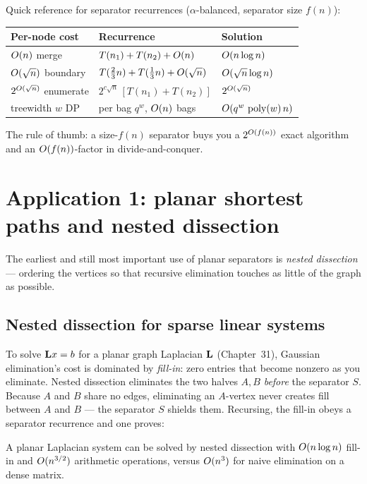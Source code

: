 \begin{complexitybox}
Quick reference for separator recurrences ($\alpha$-balanced, separator size $f(n)$):
\begin{center}
\begin{tabular}{lll}
\toprule
Per-node cost & Recurrence & Solution \\
\midrule
$O(n)$ merge & $T(n_1)+T(n_2)+O(n)$ & $O(n\log n)$ \\
$O(\sqrt n)$ boundary & $T(\tfrac23 n)+T(\tfrac13 n)+O(\sqrt n)$ & $O(\sqrt n\log n)$ \\
$2^{O(\sqrt n)}$ enumerate & $2^{c\sqrt n}\,[T(n_1)+T(n_2)]$ & $2^{O(\sqrt n)}$ \\
treewidth $w$ DP & per bag $q^{w}$, $O(n)$ bags & $O(q^{w}\,\operatorname{poly}(w)\,n)$ \\
\bottomrule
\end{tabular}
\end{center}
The rule of thumb: a size-$f(n)$ separator buys you a $2^{O(f(n))}$ exact algorithm and an $O(f(n))$-factor in divide-and-conquer.
\end{complexitybox}

\section{Application 1: planar shortest paths and nested dissection}

The earliest and still most important use of planar separators is \emph{nested dissection} --- ordering the vertices so that recursive elimination touches as little of the graph as possible.

\subsection{Nested dissection for sparse linear systems}

To solve $\mathbf{L} x=b$ for a planar graph Laplacian $\mathbf{L}$ (Chapter~31), Gaussian elimination's cost is dominated by \emph{fill-in}: zero entries that become nonzero as you eliminate. Nested dissection eliminates the two halves $A,B$ \emph{before} the separator $S$. Because $A$ and $B$ share no edges, eliminating an $A$-vertex never creates fill between $A$ and $B$ --- the separator $S$ shields them. Recursing, the fill-in obeys a separator recurrence and one proves:

\begin{theorem}\label{ch27:thm-nd}
A planar Laplacian system can be solved by nested dissection with $O(n\log n)$ fill-in and $O(n^{3/2})$ arithmetic operations, versus $O(n^3)$ for naive elimination on a dense matrix.
\end{theorem}

